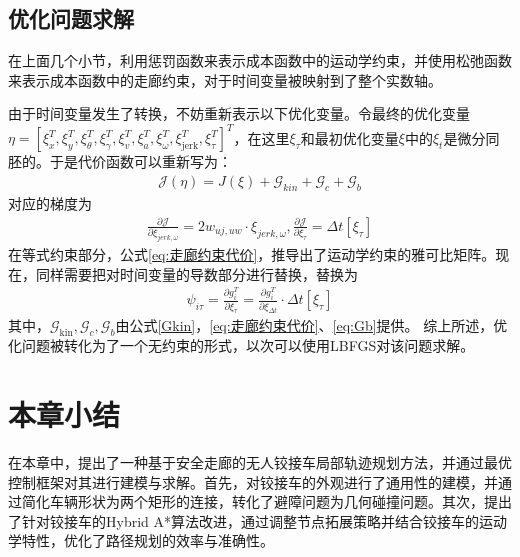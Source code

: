\documentclass[master,academic]{ysuthesis} %
\begin{document}
		\subsection{优化问题求解}
		在上面几个小节，利用惩罚函数来表示成本函数中的运动学约束，并使用松弛函数来表示成本函数中的走廊约束，对于时间变量被映射到了整个实数轴。

		由于时间变量发生了转换，不妨重新表示以下优化变量。令最终的优化变量$\eta =\left[ \xi _{x}^{T},\xi _{y}^{T},\xi _{\theta}^{T},\xi _{\gamma}^{T},\xi _{v}^{T},\xi _{a}^{T},\xi _{\omega}^{T},\xi _{\text{jerk}}^{T},\xi _{\tau}^{T} \right] ^T$，在这里$\xi _{\tau}$和最初优化变量$\xi$中的$\xi _{t}$是微分同胚的。于是代价函数可以重新写为：
		\begin{equation}
			\begin{aligned}
				\mathcal{J}\left( \eta \right) =J\left( \xi \right) +\mathcal{G}_{kin}+\mathcal{G}_c+\mathcal{G}_b
			\end{aligned}
		\end{equation}
		对应的梯度为
		\begin{equation}
			\begin{aligned}
				\frac{\partial \mathcal{J}}{\partial \xi _{jerk,\omega}}=2w_{uj,uw}\cdot \xi _{jerk,\omega},\frac{\partial \mathcal{J}}{\partial \xi _{\tau}}=\Delta t\left[ \xi _{\tau} \right]
			\end{aligned}
		\end{equation}
		在等式约束部分，公式\ref{eq:走廊约束代价}，推导出了运动学约束的雅可比矩阵。现在，同样需要把对时间变量的导数部分进行替换，替换为
		\begin{equation}
			\begin{aligned}
				\psi _{i\tau}=\frac{\partial g_{i}^{T}}{\partial \xi _{\tau}}=\frac{\partial g_{i}^{T}}{\partial \xi _{\Delta t}}\cdot \Delta t\left[ \xi _{\tau} \right] 
			\end{aligned}
		\end{equation}
		其中，$\mathcal{G}_{\text{kin}},\mathcal{G}_c,\mathcal{G}_b$由公式\ref{Gkin}，\ref{eq:走廊约束代价}、\ref{eq:Gb}提供。
		综上所述，优化问题被转化为了一个无约束的形式，以次可以使用LBFGS对该问题求解。

	\section{本章小结}
	在本章中，提出了一种基于安全走廊的无人铰接车局部轨迹规划方法，并通过最优控制框架对其进行建模与求解。首先，对铰接车的外观进行了通用性的建模，并通过简化车辆形状为两个矩形的连接，转化了避障问题为几何碰撞问题。其次，提出了针对铰接车的Hybrid A*算法改进，通过调整节点拓展策略并结合铰接车的运动学特性，优化了路径规划的效率与准确性。
\end{document}
